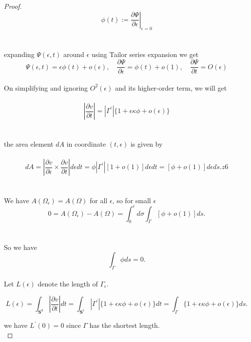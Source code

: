 \documentclass[oneside]{book}
\begin{document}
\begin{proof}
		$$\phi(t):=\left.\frac{\partial \Psi}{\partial \epsilon}\right|_{\epsilon=0}$$ \\\\
		
		expanding $\Psi(\epsilon, t)$ around $\epsilon$ using Tailor series expansion we get \\
		
		$$
		\Psi(\epsilon, t)=\epsilon \phi(t)+o(\epsilon), \quad \frac{\partial \Psi}{\partial \epsilon}=\phi(t)+o(1), \quad \frac{\partial \Psi}{\partial t}=O(\epsilon)
		$$ \\
		On simplifying and ignoring $O^2(\epsilon)$ and its higher-order term, we will get \\\\
		$$
		\left|\frac{\partial v}{\partial t}\right|=\left|\Gamma^{\prime}\right|\{1+\epsilon \kappa \phi+o(\epsilon)\}
		$$ 
		\\\\
		the area element $d A$ in coordinate $(t, \epsilon)$   is given by
		\\\\
		\begin{equation}
		\label{eq13}  
		d A=\left|\frac{\partial v}{\partial \epsilon} \times \frac{\partial v}{\partial t}\right| d \epsilon dt=\phi\left|\Gamma^{\prime}\right|[1+o(1)] d \epsilon d t=[\phi+o(1)] d \epsilon d s.z6
		\end{equation} \\\\
		We have $A\left(\Omega_{\epsilon}\right)=A(\Omega)$ for all $\epsilon$, so for small $\epsilon$ \\
		
		$$
		0 = A\left(\Omega_{\epsilon}\right)-A(\Omega)=\int_{0}^{\epsilon} d \sigma \int_{\Gamma}[\phi+o(1)] d s.
		$$
		\\\\
		So we have \\
		$$  
		\int_{\Gamma} \phi d s=0.
		$$ \\
		Let $L(\epsilon)$ denote the length of $\Gamma_{\epsilon} .$  
		
		
		
		$$ L(\epsilon)=\int_{\mathbf{S^1}}\left|\frac{\partial v}{\partial t}\right| d t=\int_{\mathbf{S}^{1}}\left|\Gamma^{\prime}\right|\{1+\epsilon \kappa \phi+o(\epsilon)\} d t=\int_{\Gamma}\{1+\epsilon \kappa \phi+o(\epsilon)\} d s. $$
		
		\hfill \break
		
		we have $L^{\prime}(0)=0$ since $\Gamma$ has the shortest length.
		\\
		

\end{proof}
\end{document}
